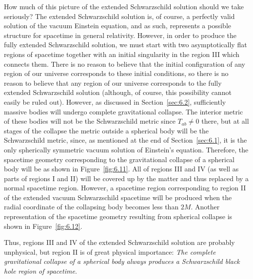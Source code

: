How much of this picture of the extended Schwarzschild solution should we take
seriously? The extended Schwarzschild solution is, of course, a perfectly valid
solution of the vacuum Einstein equation, and as such, represents a possible
structure for spacetime in general relativity. However, in order to produce the
fully extended Schwarzschild solution, we must start with two asymptotically flat
regions of spacetime together with an initial singularity in the region III which
connects them. There is no reason to believe that the initial configuration of any
region of our universe corresponds to these initial conditions, so there is no
reason to believe that any region of our universe corresponds to the fully extended
Schwarzschild solution (although, of course, this possibility cannot easily be
ruled out). However, as discussed in Section~\ref{sec:6.2}, sufficiently massive
bodies will undergo complete gravitational collapse. The interior metric of these
bodies will not be the Schwarzschild metric since \(T_{ab}\ne0\) there, but at all
stages of the collapse the metric outside a spherical body will be the
Schwarzschild metric, since, as mentioned at the end of Section~\ref{sec:6.1}, it
is the only spherically symmetric vacuum solution of Einstein's equation.
Therefore, the spacetime geometry corresponding to the gravitational collapse of a
spherical body will be as shown in Figure~\ref{fig:6.11}. All of regions III and
IV (as well as parts of regions I and II) will be covered up by the matter and
thus replaced by a normal spacetime region. However, a spacetime region
corresponding to region II of the extended vacuum Schwarzschild spacetime will be
produced when the radial coordinate of the collapsing body becomes less than
\(2M\). Another representation of the spacetime geometry resulting from spherical
collapse is shown in Figure~\ref{fig:6.12}.



Thus, regions III and IV of the extended Schwarzschild solution are probably
unphysical, but region II is of great physical importance: \emph{The complete
gravitational collapse of a spherical body always produces a Schwarzschild black
hole region of spacetime.}
